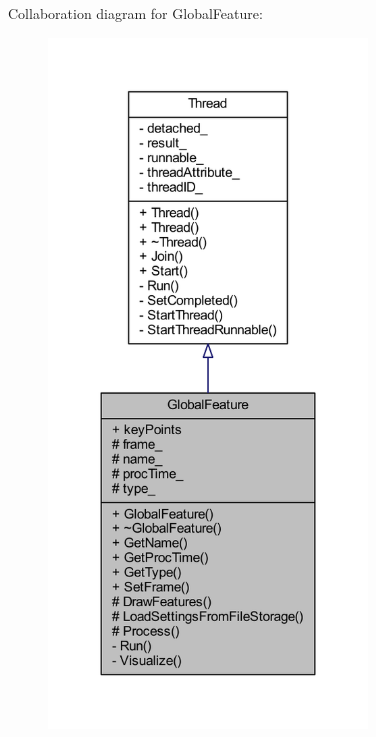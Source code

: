 Collaboration diagram for Global\-Feature\-:
\nopagebreak
\begin{figure}[H]
\begin{center}
\leavevmode
\includegraphics[width=240pt]{class_global_feature__coll__graph}
\end{center}
\end{figure}
